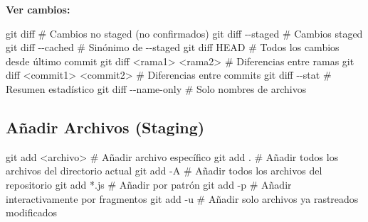 \documentclass[
  doc,
  floatsintext,
  longtable,
  a4paper,
  nolmodern,
  notxfonts,
  notimes,
  12pt,
  colorlinks=true,linkcolor=blue,citecolor=blue,urlcolor=blue]{apa7}
\newenvironment{Shaded}{\begin{snugshade}}{\end{snugshade}}
\newcommand{\AttributeTok}[1]{\textcolor[rgb]{0.40,0.45,0.13}{#1}}
\newcommand{\CommentTok}[1]{\textcolor[rgb]{0.37,0.37,0.37}{#1}}
\newcommand{\FunctionTok}[1]{\textcolor[rgb]{0.28,0.35,0.67}{#1}}
\newcommand{\NormalTok}[1]{\textcolor[rgb]{0.00,0.23,0.31}{#1}}
\newcommand{\OperatorTok}[1]{\textcolor[rgb]{0.37,0.37,0.37}{#1}}
\newcommand{\PreprocessorTok}[1]{\textcolor[rgb]{0.68,0.00,0.00}{#1}}
\begin{document}
\textbf{Ver cambios:}

\begin{Shaded}
\begin{Highlighting}[]
\FunctionTok{git}\NormalTok{ diff                   }\CommentTok{\# Cambios no staged (no confirmados)}
\FunctionTok{git}\NormalTok{ diff }\AttributeTok{{-}{-}staged}          \CommentTok{\# Cambios staged}
\FunctionTok{git}\NormalTok{ diff }\AttributeTok{{-}{-}cached}          \CommentTok{\# Sinónimo de {-}{-}staged}
\FunctionTok{git}\NormalTok{ diff HEAD              }\CommentTok{\# Todos los cambios desde último commit}
\FunctionTok{git}\NormalTok{ diff }\OperatorTok{\textless{}}\NormalTok{rama1}\OperatorTok{\textgreater{}} \OperatorTok{\textless{}}\NormalTok{rama2}\OperatorTok{\textgreater{}}   \CommentTok{\# Diferencias entre ramas}
\FunctionTok{git}\NormalTok{ diff }\OperatorTok{\textless{}}\NormalTok{commit1}\OperatorTok{\textgreater{}} \OperatorTok{\textless{}}\NormalTok{commit2}\OperatorTok{\textgreater{}}  \CommentTok{\# Diferencias entre commits}
\FunctionTok{git}\NormalTok{ diff }\AttributeTok{{-}{-}stat}            \CommentTok{\# Resumen estadístico}
\FunctionTok{git}\NormalTok{ diff }\AttributeTok{{-}{-}name{-}only}       \CommentTok{\# Solo nombres de archivos}
\end{Highlighting}
\end{Shaded}

\subsection{Añadir Archivos (Staging)}\label{auxf1adir-archivos-staging}

\begin{Shaded}
\begin{Highlighting}[]
\FunctionTok{git}\NormalTok{ add }\OperatorTok{\textless{}}\NormalTok{archivo}\OperatorTok{\textgreater{}}        \CommentTok{\# Añadir archivo específico}
\FunctionTok{git}\NormalTok{ add .                }\CommentTok{\# Añadir todos los archivos del directorio actual}
\FunctionTok{git}\NormalTok{ add }\AttributeTok{{-}A}               \CommentTok{\# Añadir todos los archivos del repositorio}
\FunctionTok{git}\NormalTok{ add }\PreprocessorTok{*}\NormalTok{.js             }\CommentTok{\# Añadir por patrón}
\FunctionTok{git}\NormalTok{ add }\AttributeTok{{-}p}               \CommentTok{\# Añadir interactivamente por fragmentos}
\FunctionTok{git}\NormalTok{ add }\AttributeTok{{-}u}               \CommentTok{\# Añadir solo archivos ya rastreados modificados}
\end{Highlighting}
\end{Shaded}
\end{document}
